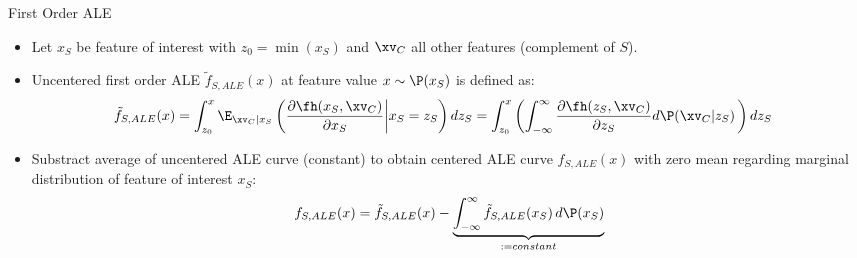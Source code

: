 \documentclass[11pt,compress,t,notes=noshow, aspectratio=169, xcolor=table]{beamer}
\begin{document}

\begin{frame}{First Order ALE}

\begin{itemize}
\item Let $x_S$ be feature of interest with $z_0 = \min(x_S)$ and $\xv_C$ all other features  (complement of $S$).
\item Uncentered first order ALE $\tilde{f}_{S, ALE}(x)$ at feature value $x \sim \P(x_S)$ is defined as:
$$
\begin{aligned}
\tilde{f}_{S, ALE}(x) &= \int_{z_{0}}^{x} \E_{\xv_C \vert x_S} \left(\frac{\partial \fh(x_S, \xv_C)}{\partial x_S} \bigg \vert x_S = z_S \right) dz_S = \int_{z_{0}}^{x} \left( \int_{-\infty}^{\infty}  \frac{\partial \fh(z_S, \xv_C)}{\partial z_S} d\P(\xv_C | z_S) \,   \right) dz_S
\end{aligned}
$$
\item Substract average of uncentered ALE curve (constant) to obtain centered ALE curve $f_{S, ALE}(x)$ with zero mean regarding marginal distribution of feature of interest $x_S$:
$$
\begin{aligned}
f_{S, ALE}(x) = \tilde{f}_{S, ALE}(x) - \underbrace{\int_{-\infty}^{\infty}\tilde{f}_{S, ALE}(x_S) \, d\P(x_S)}_{:= constant}
\end{aligned}
$$
\end{itemize}



\end{frame}

\end{document}
